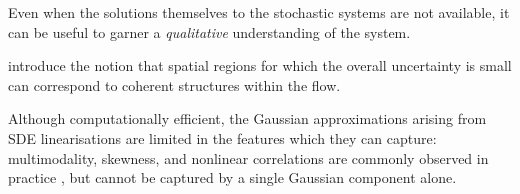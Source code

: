 Even when the solutions themselves to the stochastic systems are not available, it can be useful to garner a \emph{qualitative} understanding of the system.

\citet{Balasuriya_2020_StochasticSensitivityComputable} introduce the notion that spatial regions for which the overall uncertainty is small can correspond to coherent structures within the flow.


Although computationally efficient, the Gaussian approximations arising from SDE linearisations are limited in the features which they can capture: multimodality, skewness, and nonlinear correlations are commonly observed in practice \citep{SuraEtAl_2005_MultiplicativeNoiseNonGaussianity,BraccoEtAl_2000_VelocityProbabilityDensity,del-Castillo-Negrete_1998_AsymmetricTransportNonGaussian}, but cannot be captured by a single Gaussian component alone.


